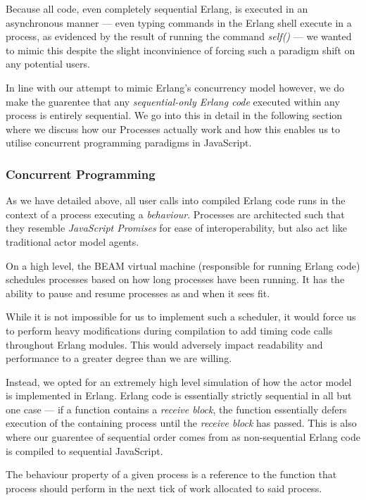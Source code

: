 \documentclass[twoside,12pt,titlepage,a4paper]{article}
\begin{document}
Because all code, even completely sequential Erlang, is executed in an asynchronous manner --- even typing commands in the Erlang shell execute in a process, as evidenced by the result of running the command \textit{self()} --- we wanted to mimic this despite the slight inconvinience of forcing such a paradigm shift on any potential users.

In line with our attempt to mimic Erlang's concurrency model however, we do make the guarentee that any \textit{sequential-only Erlang code} executed within any process is entirely sequential. We go into this in detail in the following section where we discuss how our Processes actually work and how this enables us to utilise concurrent programming paradigms in JavaScript. 

\subsubsection{Concurrent Programming} \label{sssec:num2}
As we have detailed above, all user calls into compiled Erlang code runs in the context of a process executing a \textit{behaviour}. Processes are architected such that they resemble \textit{JavaScript Promises} for ease of interoperability, but also act like traditional actor model agents.

On a high level, the BEAM virtual machine (responsible for running Erlang code) schedules processes based on how long processes have been running. It has the ability to pause and resume processes as and when it sees fit. 

While it is not impossible for us to implement such a scheduler, it would force us to perform heavy modifications during compilation to add timing code calls throughout Erlang modules. This would adversely impact readability and performance to a greater degree than we are willing.

Instead, we opted for an extremely high level simulation of how the actor model is implemented in Erlang. Erlang code is essentially strictly sequential in all but one case --- if a function contains a \textit{receive block}, the function essentially defers execution of the containing process until the \textit{receive block} has passed. This is also where our guarentee of sequential order comes from as non-sequential Erlang code is compiled to sequential JavaScript.

The behaviour property of a given process is a reference to the function that process should perform in the next tick of work allocated to said process.
\end{document}
